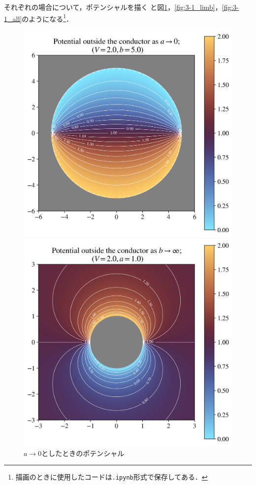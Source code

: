 それぞれの場合について，ポテンシャルを描く
と図\ref{fig:3-1_lima}，\ref{fig:3-1_limb}，\ref{fig:3-1_all}のようになる\footnote{
  描画のときに使用したコードは\texttt{.ipynb}形式で保存してある．
}．
\begin{figure}[htbp]%
  \centering%
  \begin{minipage}{0.30\linewidth}
    \centering
    \includegraphics[width=\linewidth]{py/3-1_lima.png}%
    \caption{$a \to 0$としたときのポテンシャル}%
    \label{fig:3-1_lima}%
  \end{minipage}
  \begin{minipage}{0.30\linewidth}
    \centering
    \includegraphics[width=\linewidth]{py/3-1_limb.png}%

\end{minipage}
\end{figure}
